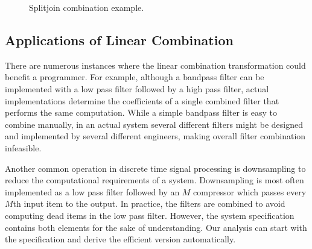 {\begin{figure}[t]
\center
\epsfxsize=2.2in
\caption{Splitjoin combination example.}
\protect\label{fig:example-splitjoin-combination}
\makeline
\vspace{-12pt}
\end{figure}


\subsection{Applications of Linear Combination}



There are numerous instances where the linear combination
transformation could benefit a programmer.  For example, although a
bandpass filter can be implemented with a low pass filter followed by
a high pass filter, actual implementations determine the
coefficients of a single combined filter that performs the same
computation. While a simple bandpass filter is easy to combine
manually, in an actual system several different filters might be
designed and implemented by several different engineers, making 
overall filter combination infeasible.

Another common operation in discrete time signal processing is
downsampling to reduce the computational requirements of a system.
Downsampling is most often implemented as a low pass filter followed
by an $M$ compressor which passes every $M$th input item to the
output.  In practice, the filters are combined to avoid computing dead
items in the low pass filter.  However, the system specification
contains both elements for the sake of understanding.  Our analysis can
start with the specification and derive the efficient version automatically.

}
